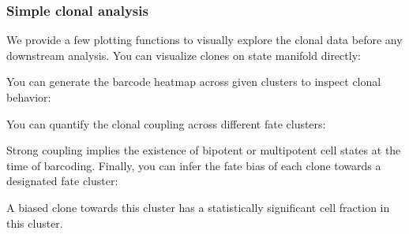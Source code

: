\documentclass[letterpaper,10pt,english]{sphinxmanual}
\begin{document}
\subsubsection{Simple clonal analysis}
\label{\detokenize{getting_started:simple-clonal-analysis}}
We provide a few plotting functions to visually explore the clonal data before any downstream analysis. You can visualize clones on state manifold directly:

\begin{sphinxVerbatim}[commandchars=\\\{\}]
\end{sphinxVerbatim}

You can generate the barcode heatmap across given clusters to inspect clonal behavior:

\begin{sphinxVerbatim}[commandchars=\\\{\}]
\end{sphinxVerbatim}

You can quantify the clonal coupling across different fate clusters:

\begin{sphinxVerbatim}[commandchars=\\\{\}]
\end{sphinxVerbatim}

Strong coupling implies the existence of bi\sphinxhyphen{}potent or multi\sphinxhyphen{}potent cell states at the time of barcoding. Finally, you can infer the fate bias of each clone towards a designated fate cluster:

\begin{sphinxVerbatim}[commandchars=\\\{\}]
\end{sphinxVerbatim}

A biased clone towards this cluster has a statistically significant cell fraction in this cluster.
\end{document}
